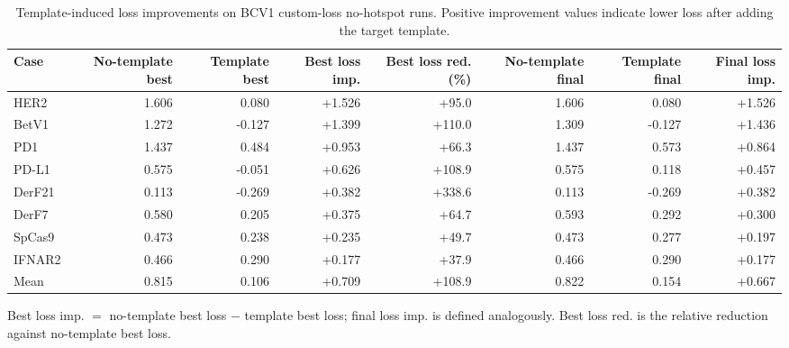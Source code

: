 \begin{table}[htbp]
\centering
\small
\caption{Template-induced loss improvements on BCV1 custom-loss no-hotspot runs. Positive improvement values indicate lower loss after adding the target template.}
\label{tab:bcv1_template_loss_improvement}
\begin{tabular}{lrrrrrrr}
\toprule
Case & No-template best & Template best & Best loss imp. & Best loss red. (\%) & No-template final & Template final & Final loss imp. \\
\midrule
HER2 & 1.606 & 0.080 & +1.526 & +95.0 & 1.606 & 0.080 & +1.526 \\
BetV1 & 1.272 & -0.127 & +1.399 & +110.0 & 1.309 & -0.127 & +1.436 \\
PD1 & 1.437 & 0.484 & +0.953 & +66.3 & 1.437 & 0.573 & +0.864 \\
PD-L1 & 0.575 & -0.051 & +0.626 & +108.9 & 0.575 & 0.118 & +0.457 \\
DerF21 & 0.113 & -0.269 & +0.382 & +338.6 & 0.113 & -0.269 & +0.382 \\
DerF7 & 0.580 & 0.205 & +0.375 & +64.7 & 0.593 & 0.292 & +0.300 \\
SpCas9 & 0.473 & 0.238 & +0.235 & +49.7 & 0.473 & 0.277 & +0.197 \\
IFNAR2 & 0.466 & 0.290 & +0.177 & +37.9 & 0.466 & 0.290 & +0.177 \\
\midrule
Mean & 0.815 & 0.106 & +0.709 & +108.9 & 0.822 & 0.154 & +0.667 \\
\bottomrule
\end{tabular}

\vspace{0.4em}
\footnotesize{Best loss imp. $=$ no-template best loss $-$ template best loss; final loss imp. is defined analogously. Best loss red. is the relative reduction against no-template best loss.}
\end{table}
